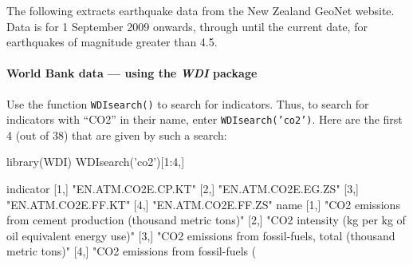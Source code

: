 \documentclass{tufte-book}\usepackage[]{graphicx}\usepackage[]{color}
\newcommand{\txtt}[1]{\texttt{#1}}
\begin{document}
  The following
extracts earthquake data from the New Zealand GeoNet
website.  Data is for 1 September 2009 onwards, through until the
current date, for earthquakes of magnitude greater than 4.5.
\begin{Schunk}
\end{Schunk}

\paragraph{World Bank data --- using the {\em WDI} package}

Use the function \txtt{WDIsearch()} to search for indicators.  Thus,
to search for indicators with ``CO2'' in their name, enter
\txtt{WDIsearch('co2')}.  Here are the first 4 (out of 38) that are
given by such a search:
\begin{fullwidth}
\begin{Schunk}
\begin{Sinput}
library(WDI)
WDIsearch('co2')[1:4,]
\end{Sinput}
\begin{Soutput}
     indicator          
[1,] "EN.ATM.CO2E.CP.KT"
[2,] "EN.ATM.CO2E.EG.ZS"
[3,] "EN.ATM.CO2E.FF.KT"
[4,] "EN.ATM.CO2E.FF.ZS"
     name                                                           
[1,] "CO2 emissions from cement production (thousand metric tons)"  
[2,] "CO2 intensity (kg per kg of oil equivalent energy use)"       
[3,] "CO2 emissions from fossil-fuels, total (thousand metric tons)"
[4,] "CO2 emissions from fossil-fuels (%
\end{Soutput}
\end{Schunk}
\end{fullwidth}
\end{document}
